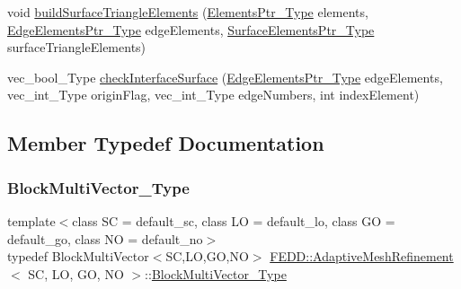 \begin{DoxyCompactItemize}
void \hyperlink{classFEDD_1_1AdaptiveMeshRefinement_ac17385ec3b84fd7c285b5442476f40a9}{build\+Surface\+Triangle\+Elements} (\hyperlink{classFEDD_1_1AdaptiveMeshRefinement_a9a08c5e3801ff9f9f3dff7997f9f4b1b}{Elements\+Ptr\+\_\+\+Type} elements, \hyperlink{classFEDD_1_1AdaptiveMeshRefinement_a495f60e86da92289b7fe1c15e291660d}{Edge\+Elements\+Ptr\+\_\+\+Type} edge\+Elements, \hyperlink{classFEDD_1_1AdaptiveMeshRefinement_aabda3ef3658f8847265104c6cf9a3877}{Surface\+Elements\+Ptr\+\_\+\+Type} surface\+Triangle\+Elements)
\item 
vec\+\_\+bool\+\_\+\+Type \hyperlink{classFEDD_1_1AdaptiveMeshRefinement_a35ec26c4ed6ccbf878ce35cf86a6b455}{check\+Interface\+Surface} (\hyperlink{classFEDD_1_1AdaptiveMeshRefinement_a495f60e86da92289b7fe1c15e291660d}{Edge\+Elements\+Ptr\+\_\+\+Type} edge\+Elements, vec\+\_\+int\+\_\+\+Type origin\+Flag, vec\+\_\+int\+\_\+\+Type edge\+Numbers, int index\+Element)
\end{DoxyCompactItemize}


\subsection{Member Typedef Documentation}
\mbox{\label{classFEDD_1_1AdaptiveMeshRefinement_ace60cfe1caf8767564c40edef5ca8b0b}} 
\subsubsection{\texorpdfstring{Block\+Multi\+Vector\+\_\+\+Type}{BlockMultiVector\_Type}}
{\footnotesize\ttfamily template$<$class SC = default\+\_\+sc, class LO = default\+\_\+lo, class GO = default\+\_\+go, class NO = default\+\_\+no$>$ \\
typedef Block\+Multi\+Vector$<$SC,LO,GO,NO$>$ \hyperlink{classFEDD_1_1AdaptiveMeshRefinement}{F\+E\+D\+D\+::\+Adaptive\+Mesh\+Refinement}$<$ SC, LO, GO, NO $>$\+::\hyperlink{classFEDD_1_1AdaptiveMeshRefinement_ace60cfe1caf8767564c40edef5ca8b0b}{Block\+Multi\+Vector\+\_\+\+Type}}

\mbox{\label{classFEDD_1_1AdaptiveMeshRefinement_a62f59092ab4dee90885c4d38b123ca9c}} 
